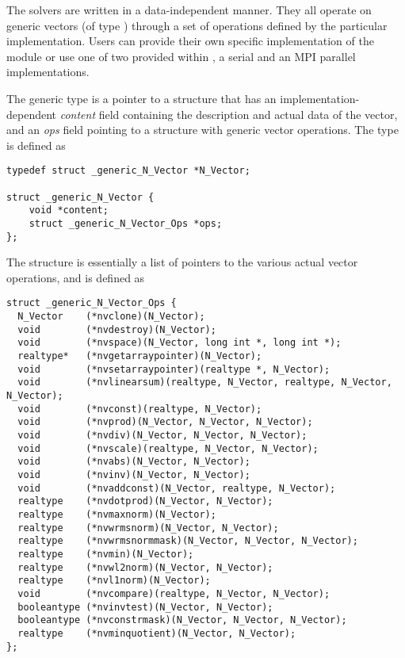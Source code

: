 %
The {\sundials} solvers are written in a data-independent manner. 
They all operate on generic vectors (of type ) through a set of
operations defined by the particular {\nvector} implementation.
Users can provide their own specific implementation of the {\nvector} module
or use one of two provided within {\sundials}, a serial and an MPI parallel
implementations.

The generic  type is a pointer to a structure that has an 
implementation-dependent {\em content} field containing the 
description and actual data of the vector, and an {\em ops} field 
pointing to a structure with generic vector operations.
The type  is defined as
\begin{verbatim}
typedef struct _generic_N_Vector *N_Vector;

struct _generic_N_Vector {
    void *content;
    struct _generic_N_Vector_Ops *ops;
};
\end{verbatim}
The  structure is essentially a list of pointers to
the various actual vector operations, and is defined as
\begin{verbatim}
struct _generic_N_Vector_Ops {
  N_Vector    (*nvclone)(N_Vector);
  void        (*nvdestroy)(N_Vector);
  void        (*nvspace)(N_Vector, long int *, long int *);
  realtype*   (*nvgetarraypointer)(N_Vector);
  void        (*nvsetarraypointer)(realtype *, N_Vector);
  void        (*nvlinearsum)(realtype, N_Vector, realtype, N_Vector, N_Vector); 
  void        (*nvconst)(realtype, N_Vector);
  void        (*nvprod)(N_Vector, N_Vector, N_Vector);
  void        (*nvdiv)(N_Vector, N_Vector, N_Vector);
  void        (*nvscale)(realtype, N_Vector, N_Vector);
  void        (*nvabs)(N_Vector, N_Vector);
  void        (*nvinv)(N_Vector, N_Vector);
  void        (*nvaddconst)(N_Vector, realtype, N_Vector);
  realtype    (*nvdotprod)(N_Vector, N_Vector);
  realtype    (*nvmaxnorm)(N_Vector);
  realtype    (*nvwrmsnorm)(N_Vector, N_Vector);
  realtype    (*nvwrmsnormmask)(N_Vector, N_Vector, N_Vector);
  realtype    (*nvmin)(N_Vector);
  realtype    (*nvwl2norm)(N_Vector, N_Vector);
  realtype    (*nvl1norm)(N_Vector);
  void        (*nvcompare)(realtype, N_Vector, N_Vector);
  booleantype (*nvinvtest)(N_Vector, N_Vector);
  booleantype (*nvconstrmask)(N_Vector, N_Vector, N_Vector);
  realtype    (*nvminquotient)(N_Vector, N_Vector);
};
\end{verbatim}




